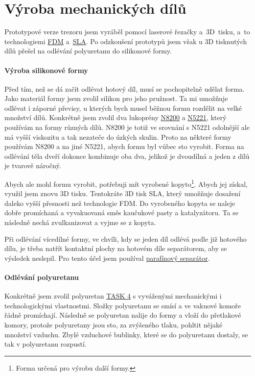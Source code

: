 \newpage
\section{Výroba mechanických dílů}
Prototypové verze trezoru jsem vyráběl pomocí laserové řezačky a~3D~tisku, a~to technologiemi \href{https://www.3dhubs.com/guides/3d-printing/#fdm}{FDM} 
a~\href{https://www.3dhubs.com/guides/3d-printing/#sla-dlp}{SLA}. 
Po odzkoušení prototypů jsem však u 3D tisknutých dílů přešel na odlévání polyuretanu do silikonové formy. 

\paragraph*{Výroba silikonové formy}
Před tím, než se dá začít odlévat hotový díl, musí se pochopitelně udělat forma. 
Jako materiál formy jsem zvolil silikon pro jeho pružnost. 
Ta mi umožňuje odlévat i záporné převisy, u kterých bych musel běžnou formu rozdělit na velké množství dílů.
Konkrétně jsem zvolil dva lukoprény \href{https://www.lucebni.cz/cs/lukopren-n/49-silikonovy-kaucuk-lukopren-n-8200.html}{N8200} 
a \href{https://www.lucebni.cz/cs/lukopren-n/43-silikonovy-kaucuk-lukopren-n-5221.html}{N5221}, který používám na formy různých dílů.
N8200 je totiž ve srovnání s N5221 odolnější ale má vyšší viskozitu a tak nezateče do úzkých skulin.
Proto na některé formy používám N8200 a na jiné N5221, abych formu byl vůbec sto vyrobit. 
Forma na odlévání těla dveří dokonce kombinuje oba dva, jelikož je dvoudílná a jeden z dílů je tvarově náročný.

Abych ale mohl formu vyrobit, potřebuji mít vyrobené 
kopyto\footnote{Forma určená pro výrobu další formy.}. Abych jej získal, využil jsem znovu 3D tisku.
Tentokráte 3D tisk SLA, který umožňuje dosažení daleko vyšší přesnosti než technologie FDM. %
Do vyrobeného kopyta se naleje dobře promíchaná a vyvakuovaná směs kaučukové pasty a katalyzátoru.
Ta se následně nechá zvulkanizovat a vyjme se z kopyta.

Při odlévání vícedílné formy, ve chvíli, kdy se jeden díl odlévá podle již hotového dílu, je třeba natřít kontaktní plochy na hotovém díle separátorem, aby se výsledek neslepil.
Pro tento účel jsem používal \href{https://www.lucebni.cz/cs/pomocne-pripravky/54-lukopren-parafinovy-separator.html}{parafínový separátor}.

\paragraph*{Odlévání polyuretanu}
Konkrétně jsem zvolil polyuretan \href{https://www.smooth-on.com/tb/files/TASK_4_TB.pdf}{TASK 4} s vyvá\-že\-ný\-mi mechanickými i technologickými vlastnostmi.
Složky polyuretanu se smísí a ve vakuové komoře řádně promíchají. Následně se polyuretan nalije do formy a vloží do přetlakové komory,
protože polyuretany jsou sto, za zvýšeného tlaku, pohltit nějaké množství vzduchu.
Zbylé vzduchové bublinky, které se do polyuretanu dostaly, se tak v polyuretanu rozpustí.
